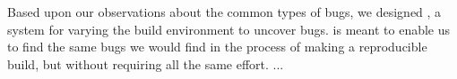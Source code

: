 \section{\sysname}
\label{SEC:architecture}

Based upon our observations about the common types of bugs, we designed
\sysname, a system for varying the build environment to uncover bugs.
\sysname is meant to enable us to find the same bugs we would find in the
process of making a reproducible build, but without requiring all the same
effort. ...

